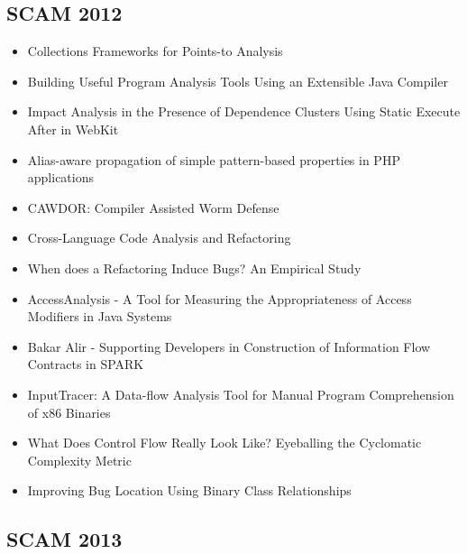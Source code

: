 \subsection{SCAM 2012}

{\small
\begin{itemize}[itemsep=-1ex]
  \item Collections Frameworks for Points-to Analysis
  \item Building Useful Program Analysis Tools Using an Extensible Java Compiler
  \item Impact Analysis in the Presence of Dependence Clusters Using Static Execute After in WebKit
  \item Alias-aware propagation of simple pattern-based properties in PHP applications
  \item CAWDOR: Compiler Assisted Worm Defense
  \item Cross-Language Code Analysis and Refactoring
  \item When does a Refactoring Induce Bugs? An Empirical Study
  \item AccessAnalysis - A Tool for Measuring the Appropriateness of Access Modifiers in Java Systems
  \item Bakar Alir - Supporting Developers in Construction of Information Flow Contracts in SPARK
  \item InputTracer: A Data-flow Analysis Tool for Manual Program Comprehension of x86 Binaries
  \item What Does Control Flow Really Look Like? Eyeballing the Cyclomatic Complexity Metric
  \item Improving Bug Location Using Binary Class Relationships
\end{itemize}
}

\subsection{SCAM 2013}

